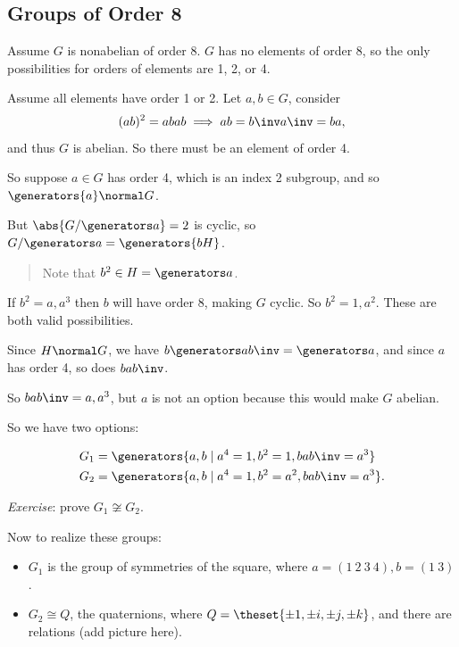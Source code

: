 \hypertarget{groups-of-order-8}{%
\subsection{Groups of Order 8}\label{groups-of-order-8}}

Assume \(G\) is nonabelian of order 8. \(G\) has no elements of order 8,
so the only possibilities for orders of elements are 1, 2, or 4.

Assume all elements have order 1 or 2. Let \(a,b\in G\), consider
\begin{align*}
(ab)^2 = abab \implies ab=b\inv a\inv = ba
,\end{align*} and thus \(G\) is abelian. So there must be an element of
order 4.

So suppose \(a\in G\) has order 4, which is an index 2 subgroup, and so
\(\generators{a} \normal G\).

But \(\abs{G/\generators a} = 2\) is cyclic, so
\(G/\generators a = \generators{bH}\).

\begin{quote}
Note that \(b^2 \in H = \generators a\).
\end{quote}

If \(b^2=a, a^3\) then \(b\) will have order 8, making \(G\) cyclic. So
\(b^2 = 1, a^2\). These are both valid possibilities.

Since \(H \normal G\), we have \(b\generators a b\inv = \generators a\),
and since \(a\) has order 4, so does \(bab\inv\).

So \(bab\inv = a, a^3\), but \(a\) is not an option because this would
make \(G\) abelian.

So we have two options:

\begin{align*}
G_1 &= \generators{a, b \mid a^4 = 1, b^2=1, bab\inv = a^3} \\
G_2 &= \generators{a, b \mid a^4 = 1, b^2 = a^2, bab\inv = a^3}
.\end{align*}

\emph{Exercise}: prove \(G_1 \not\cong G_2\).

Now to realize these groups:

\begin{itemize}
\item
  \(G_1\) is the group of symmetries of the square, where
  \(a = (1~2~3~4), b=(1~3)\).
\item
  \(G_2 \cong Q\), the quaternions, where
  \(Q = \theset{\pm 1,\pm i, \pm j, \pm k}\), and there are relations
  (add picture here).
\end{itemize}

